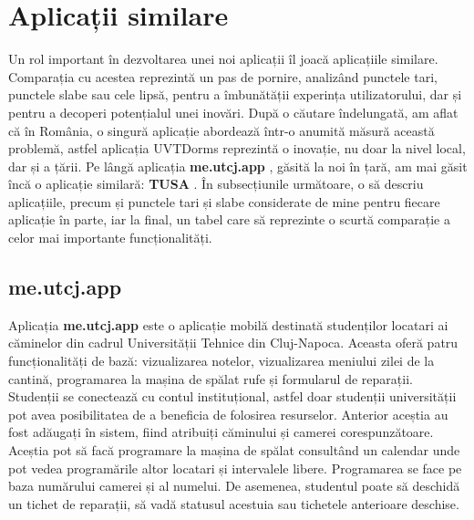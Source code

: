 \documentclass[12pt,a4paper]{report}
\theoremstyle{definition}
\theoremstyle{remark}
\begin{document}
\section{Aplicații similare}
\par Un rol important în dezvoltarea unei noi aplicații îl joacă aplicațiile similare. Comparația cu acestea reprezintă un pas de pornire, analizând punctele tari, punctele slabe sau cele lipsă, pentru a îmbunătății experința utilizatorului, dar și pentru a decoperi potențialul unei inovări. După o căutare îndelungată, am aflat că în România, o singură aplicație abordează într-o anumită măsură această problemă, astfel 
 aplicația UVTDorms reprezintă o inovație, nu doar la nivel local, dar și a țării. Pe lângă aplicația \textbf{me.utcj.app} \cite{me.utcj.app}, găsită la noi în țară, am mai găsit încă o aplicație similară: \textbf{TUSA} \cite{tusa_home_page}.  În subsecțiunile următoare, o să descriu aplicațiile, precum și punctele tari și slabe considerate de mine pentru fiecare aplicație în parte, iar la final, un tabel care să reprezinte o scurtă comparație a celor mai importante funcționalități.

\subsection{me.utcj.app}
\par Aplicația \textbf{me.utcj.app} este o aplicație mobilă destinată studenților locatari ai \textnormal{că\-mi\-ne\-lor}  din cadrul Universității Tehnice din Cluj-Napoca. Aceasta oferă patru \textnormal{func\-ți\-o\-na\-li\-tă\-ți} de bază: vizualizarea notelor, vizualizarea meniului zilei de la cantină, programarea la mașina de spălat rufe și formularul de reparații. Studenții se conectează cu contul instituțional, astfel doar studenții universității pot avea posibilitatea de a beneficia de folosirea resurselor. Anterior aceștia au fost adăugați în sistem, fiind atribuiți căminului și camerei corespunzătoare. Aceștia pot să facă programare la mașina de spălat consultând un calendar unde pot vedea programările altor locatari și intervalele libere. Programarea se face pe baza numărului camerei și al numelui. De asemenea, studentul poate să deschidă un tichet de reparații, să vadă statusul acestuia sau tichetele anterioare deschise.
\end{document}
